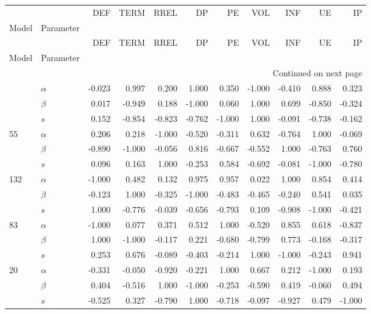 \begin{longtable}{llrrrrrrrrr}
\label{tab:SSD_ABS_standardised_5}\\
\toprule
    &     &    DEF &   TERM &   RREL &     DP &     PE &    VOL &    INF &     UE &     IP \\
Model & Parameter &        &        &        &        &        &        &        &        &        \\
\midrule
\endfirsthead

\toprule
    &     &    DEF &   TERM &   RREL &     DP &     PE &    VOL &    INF &     UE &     IP \\
Model & Parameter &        &        &        &        &        &        &        &        &        \\
\midrule
\endhead
\midrule
\multicolumn{11}{r}{{Continued on next page}} \\
\midrule
\endfoot

\bottomrule
\endlastfoot
\multirow{3}{*}{23} & $\alpha$ & -0.023 &  0.997 &  0.200 &  1.000 &  0.350 & -1.000 & -0.410 &  0.888 &  0.323 \\
    & $\beta$ &  0.017 & -0.949 &  0.188 & -1.000 &  0.060 &  1.000 &  0.699 & -0.850 & -0.324 \\
    & $s$ &  0.152 & -0.854 & -0.823 & -0.762 & -1.000 &  1.000 & -0.091 & -0.738 & -0.162 \\
\cline{1-11}
\multirow{3}{*}{55} & $\alpha$ &  0.206 &  0.218 & -1.000 & -0.520 & -0.311 &  0.632 & -0.764 &  1.000 & -0.069 \\
    & $\beta$ & -0.890 & -1.000 & -0.056 &  0.816 & -0.667 & -0.552 &  1.000 & -0.763 &  0.760 \\
    & $s$ &  0.096 &  0.163 &  1.000 & -0.253 &  0.584 & -0.692 & -0.081 & -1.000 & -0.780 \\
\cline{1-11}
\multirow{3}{*}{132} & $\alpha$ & -1.000 &  0.482 &  0.132 &  0.975 &  0.957 &  0.022 &  1.000 &  0.854 &  0.414 \\
    & $\beta$ & -0.123 &  1.000 & -0.325 & -1.000 & -0.483 & -0.465 & -0.240 &  0.541 &  0.035 \\
    & $s$ &  1.000 & -0.776 & -0.039 & -0.656 & -0.793 &  0.109 & -0.908 & -1.000 & -0.421 \\
\cline{1-11}
\multirow{3}{*}{83} & $\alpha$ & -1.000 &  0.077 &  0.371 &  0.512 &  1.000 & -0.520 &  0.855 &  0.618 & -0.837 \\
    & $\beta$ &  1.000 & -1.000 & -0.117 &  0.221 & -0.680 & -0.799 &  0.773 & -0.168 & -0.317 \\
    & $s$ &  0.253 &  0.676 & -0.089 & -0.403 & -0.214 &  1.000 & -1.000 & -0.243 &  0.941 \\
\cline{1-11}
\multirow{3}{*}{20} & $\alpha$ & -0.331 & -0.050 & -0.920 & -0.221 &  1.000 &  0.667 &  0.212 & -1.000 &  0.193 \\
    & $\beta$ &  0.404 & -0.516 &  1.000 & -1.000 & -0.253 & -0.590 &  0.419 & -0.060 &  0.494 \\
    & $s$ & -0.525 &  0.327 & -0.790 &  1.000 & -0.718 & -0.097 & -0.927 &  0.479 & -1.000 \\
\end{longtable}
